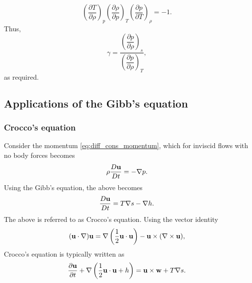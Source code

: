\documentclass[oneside,a4paper,11pt]{report}
\begin{document}
\begin{equation}
    \left( \frac{\partial T}{\partial \rho} \right)_p \left( \frac{\partial \rho}{\partial p} \right)_T \left( \frac{\partial p}{\partial T} \right)_\rho = -1.
\end{equation}
Thus,
\begin{equation}
    \gamma = \frac{ \left( \dfrac{\partial p}{\partial \rho} \right)_s }{\left( \dfrac{\partial p}{\partial \rho} \right)_T},
\end{equation}
as required.

\subsection{Applications of the Gibb's equation}

\subsubsection{Crocco's equation}
Consider the momentum \cref{eq:diff_cons_momentum}, which for inviscid flows with no body forces becomes
\begin{equation}
    \rho \frac{D \mathbf{u}}{Dt} = -\nabla p.
\end{equation}
Using the Gibb's equation, the above becomes
\begin{equation}
    \frac{D \mathbf{u}}{Dt} = T\nabla s - \nabla h.
\end{equation}
The above is referred to as Crocco's equation. Using the vector identity
\begin{equation}
    (\mathbf{u} \cdot \nabla) \mathbf{u} = \nabla \left ( \frac{1}{2} \mathbf{u} \cdot \mathbf{u} \right ) - \mathbf{u} \times (\nabla \times \mathbf{u}),
\end{equation}
Crocco's equation is typically written as
\begin{equation}
    \frac{\partial \mathbf{u}}{\partial t} + \nabla \left (\frac{1}{2} \mathbf{u} \cdot \mathbf{u} + h \right ) = \mathbf{u} \times \mathbf{w} + T \nabla s.
\end{equation}
\end{document}
